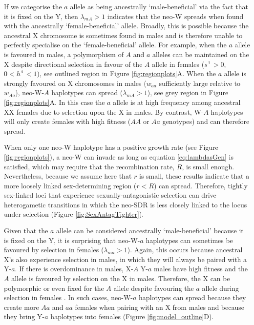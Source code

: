 \documentclass[12pt]{article}
\begin{document}
If we categorise the $a$ allele as being ancestrally `male-beneficial' via the fact that it is fixed on the Y, then $\lambda_{mA}>1$ indicates that the neo-W spreads when found with the ancestrally `female-beneficial' allele. 
Broadly, this is possible because the ancestral X chromosome is sometimes found in males and is therefore unable to perfectly specialise on the `female-beneficial' allele. 
For example, when the $a$ allele is favoured in males, a polymorphism of $A$ and $a$ alleles can be maintained on the X despite directional selection in favour of the $A$ allele in females ($s^\female>0$, $0<h^\female<1$), see outlined region in Figure \ref{fig:regionplots}A. 
When the $a$ allele is strongly favoured on X chromosomes in males ($w_{aa}$ sufficiently large relative to $w_{Aa}$), neo-W-$A$ haplotypes can spread ($\lambda_{mA}>1$), see grey region in Figure \ref{fig:regionplots}A.
In this case the $a$ allele is at high frequency among ancestral XX females due to selection upon the X in males. 
By contrast, W-$A$ haplotypes will only create females with high fitness ($AA$ or $Aa$ genotypes) and can therefore spread. 

When only one neo-W haplotype has a positive growth rate (see Figure \ref{fig:regionplots}), a neo-W can invade as long as equation \eqref{eq:lambdasGen} is satisfied, which may require that the recombination rate, $R$, is small enough.
Nevertheless, because we assume here that $r$ is small, these results indicate that a more loosely linked sex-determining region ($r<R$) can spread.
Therefore, tightly sex-linked loci that experience sexually-antagonistic selection can drive heterogametic transitions in which the neo-SDR is less closely linked to the locus under selection (Figure \ref{fig:SexAntagTighter}). 

Given that the $a$ allele can be considered ancestrally `male-beneficial' because it is fixed on the Y, it is surprising that neo-W-$a$ haplotypes can sometimes be favoured by selection in females ($\lambda_{ma}>1$). 
Again, this occurs because ancestral X's also experience selection in males, in which they will always be paired with a Y-$a$. 
If there is overdominance in males, X-$A$ Y-$a$ males have high fitness and the $A$ allele is favoured by selection on the X in males. 
Therefore, the X can be polymorphic or even fixed for the $A$ allele despite favouring the $a$ allele during selection in females \citep[e.g., see outlined region in Figure \ref{fig:regionplots}B and][]{Lloyd1977,Otto2014}. 
In such cases, neo-W-$a$ haplotypes can spread because they create more $Aa$ and $aa$ females when pairing with an X from males and because they bring Y-$a$ haplotypes into females (Figure \ref{fig:model_outline}D). 
\end{document}
